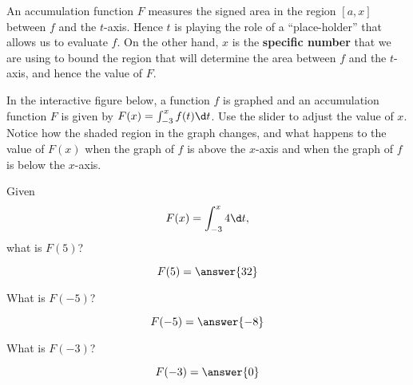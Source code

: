 \documentclass{ximera}
\begin{document}
An accumulation function $F$ measures the signed area in the region
$[a,x]$ between $f$ and the $t$-axis. Hence $t$ is playing the role of
a ``place-holder'' that allows us to evaluate $f$. On the other hand,
$x$ is the \textbf{specific number} that we are using to bound the
region that will determine the area between $f$ and the $t$-axis, and
hence the value of $F$.

In the interactive figure below, a function $f$ is graphed and an accumulation function $F$ is given by $F(x) = \int_{-3}^x f(t) \d t$. 
Use the slider to adjust the value of $x$. Notice how the shaded region in the graph changes, and what happens to the value of $F(x)$ 
when the graph of $f$ is above the $x$-axis and when the graph of $f$ is below the $x$-axis.
\begin{center}
\end{center}


\begin{question}
  Given
  \[
  F(x) = \int_{-3}^x 4 \d t,
  \]
  what is $F(5)$?
  \begin{prompt}
    \[
    F(5) = \answer{32}
    \]
  \end{prompt}
  \begin{question}
    What is $F(-5)$?
    \begin{prompt}
      \[
      F(-5) = \answer{-8}
      \]
    \end{prompt}
  \end{question}
  \begin{question}
    What is $F(-3)$?
    \begin{prompt}
      \[
      F(-3) = \answer{0}
      \]
    \end{prompt}
  \end{question}
\end{question}
\end{document}
